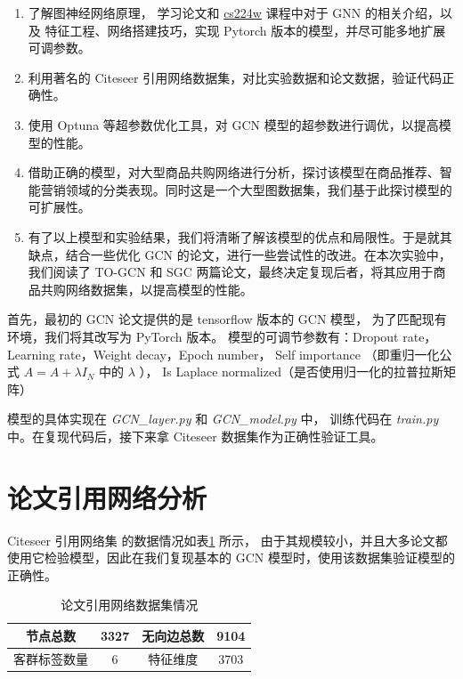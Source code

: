 \documentclass[12pt]{ctexart} %
\begin{document}
\begin{enumerate}
    \item 了解图神经网络原理， 学习论文和 \href{https://web.stanford.edu/class/cs224w/}{cs224w}  课程中对于 GNN 的相关介绍，以及
特征工程、网络搭建技巧，实现 Pytorch 版本的模型，并尽可能多地扩展可调参数。
    \item 利用著名的 Citeseer \cite{yang_revisiting_2016} 引用网络数据集，对比实验数据和论文数据，验证代码正确性。
    \item 使用 Optuna 等超参数优化工具，对 GCN 模型的超参数进行调优，以提高模型的性能。
    \item 借助正确的模型，对大型商品共购网络进行分析，探讨该模型在商品推荐、智能营销领域的分类表现。同时这是一个大型图数据集，我们基于此探讨模型的可扩展性。
    \item 有了以上模型和实验结果，我们将清晰了解该模型的优点和局限性。于是就其缺点，结合一些优化 GCN 的论文，进行一些尝试性的改进。在本次实验中，
          我们阅读了 TO-GCN \cite{yang_2019_topology} 和 SGC \cite{wu_simplifying_2019} 两篇论文，最终决定复现后者，将其应用于商品共购网络数据集，以提高模型的性能。
\end{enumerate}

首先，最初的 GCN 论文提供的是 tensorflow 版本的 GCN 模型\cite{kipf2017semi}，
为了匹配现有环境，我们将其改写为 PyTorch 版本。
模型的可调节参数有：Dropout rate， Learning rate，Weight decay，Epoch number， 
Self importance （即重归一化公式 $A = A + \lambda I_N$ 中的 $\lambda$  ），
Is Laplace normalized（是否使用归一化的拉普拉斯矩阵）

模型的具体实现在 \textit{GCN\_layer.py} 和 \textit{GCN\_model.py} 中，
训练代码在 \textit{train.py} 中。在复现代码后，接下来拿 Citeseer 数据集作为正确性验证工具。

\section{论文引用网络分析}

Citeseer 引用网络集 \cite{yang_revisiting_2016} 的数据情况如表\ref{tab:citeseer-table} 所示，
由于其规模较小，并且大多论文都使用它检验模型，因此在我们复现基本的 GCN 模型时，使用该数据集验证模型的正确性。

\begin{table}[h]
    \centering
    \begin{tabular}{|c|c|c|c|}
        \hline
        节点总数 &  3327 & 无向边总数 & 9104 \\
        \hline
        客群标签数量 & 6 & 特征维度 & 3703 \\
        \hline
    \end{tabular}
    \caption{论文引用网络数据集情况}
    \label{tab:citeseer-table}
\end{table}
\end{document}
